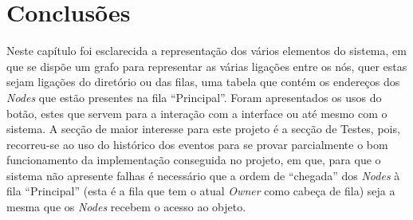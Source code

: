 \section{Conclusões}
\label{validacao:sec:conclusoes}
Neste capítulo foi esclarecida a representação dos vários elementos do sistema, em que se dispõe um
grafo para representar as várias ligações entre os nós, quer estas sejam ligações do diretório ou das filas, 
uma tabela que contém os endereços dos \emph{Nodes} que estão presentes na fila ``Principal''.
Foram apresentados os usos do botão, estes que servem para a interação com a interface ou até mesmo com o sistema.
A secção de maior interesse para este projeto é a secção de Testes, pois, recorreu-se ao uso do histórico dos eventos para 
se provar parcialmente o bom funcionamento da implementação conseguida no projeto, em que, para que o sistema não apresente falhas
é necessário que a ordem de ``chegada'' dos \emph{Nodes} à fila ``Principal'' (esta é a fila que tem o atual \emph{Owner} como cabeça de fila)
seja a mesma que os \emph{Nodes} recebem o acesso ao objeto.
